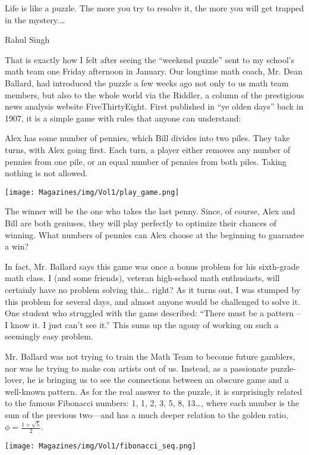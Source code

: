 \documentclass{article}
\begin{document}
\begin{multicols}{3}

\epigraph{Life is like a puzzle. The more you try to resolve it, the more you will get trapped in the mystery.\dots}{Rahul Singh}

That is exactly how I felt after seeing the “weekend puzzle” sent to my school’s math team one Friday afternoon in January. Our longtime math coach, Mr. Dean Ballard, had introduced the puzzle a few weeks ago not only to us math team members, but also to the whole world via the Riddler, a column of the prestigious news analysis website FiveThirtyEight. First published in ``ye olden days'' back in 1907, it is a simple game with rules that anyone can understand:

Alex has some number of pennies, which Bill divides into two piles. They take turns, with Alex going first. Each turn, a player either removes any number of pennies from one pile, or an equal number of pennies from both piles. Taking nothing is not allowed.

\begin{center}
     \texttt{[image: Magazines/img/Vol1/play\_game.png]}
\end{center}

The winner will be the one who takes the last penny. Since, of course, Alex and Bill are both geniuses, they will play perfectly to optimize their chances of winning. What numbers of pennies can Alex choose at the beginning to guarantee a win?


In fact, Mr. Ballard says this game was once a bonus problem for his sixth-grade math class. I (and some friends), veteran high-school math enthusiasts, will certainly have no problem solving this… right? As it turns out, I was stumped by this problem for several days, and almost anyone would be challenged to solve it. One student who struggled with the game described: “There must be a pattern – I know it. I just can’t see it.” This sums up the agony of working on such a seemingly easy problem.


Mr. Ballard was not trying to train the Math Team to become future gamblers, nor was he trying to make con artists out of us. Instead, as a passionate puzzle-lover, he is bringing us to see the connections between an obscure game and a well-known pattern.
As for the real answer to the puzzle, it is surprisingly related to the famous Fibonacci numbers: 1, 1, 2, 3, 5, 8, 13…, where each number is the sum of the previous two—and has a much deeper relation to the golden ratio, $\phi = \frac{1+\sqrt{5}}2$.
\begin{center}
    \texttt{[image: Magazines/img/Vol1/fibonacci\_seq.png]}
\end{center}


\end{multicols}
\end{document}
